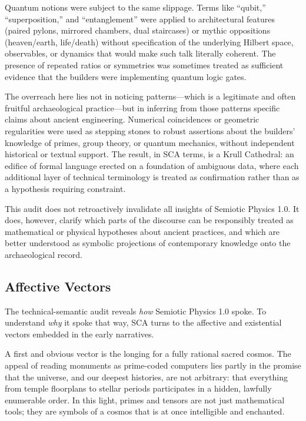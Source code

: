 \documentclass[12]{amsart}
\theoremstyle{plain}
\begin{document}
Quantum notions were subject to the same slippage. Terms like ``qubit,'' ``superposition,'' and ``entanglement'' were applied to architectural features (paired pylons, mirrored chambers, dual staircases) or mythic oppositions (heaven/earth, life/death) without specification of the underlying Hilbert space, observables, or dynamics that would make such talk literally coherent. The presence of repeated ratios or symmetries was sometimes treated as sufficient evidence that the builders were implementing quantum logic gates.

The overreach here lies not in noticing patterns---which is a legitimate and often fruitful archaeological practice---but in inferring from those patterns specific claims about ancient engineering. Numerical coincidences or geometric regularities were used as stepping stones to robust assertions about the builders' knowledge of primes, group theory, or quantum mechanics, without independent historical or textual support. The result, in SCA terms, is a Krull Cathedral: an edifice of formal language erected on a foundation of ambiguous data, where each additional layer of technical terminology is treated as confirmation rather than as a hypothesis requiring constraint.

This audit does not retroactively invalidate all insights of Semiotic Physics 1.0. It does, however, clarify which parts of the discourse can be responsibly treated as mathematical or physical hypotheses about ancient practices, and which are better understood as symbolic projections of contemporary knowledge onto the archaeological record.

\subsection{Affective Vectors}

The technical-semantic audit reveals \emph{how} Semiotic Physics 1.0 spoke. To understand \emph{why} it spoke that way, SCA turns to the affective and existential vectors embedded in the early narratives.

A first and obvious vector is the longing for a fully rational sacred cosmos. The appeal of reading monuments as prime-coded computers lies partly in the promise that the universe, and our deepest histories, are not arbitrary: that everything from temple floorplans to stellar periods participates in a hidden, lawfully enumerable order. In this light, primes and tensors are not just mathematical tools; they are symbols of a cosmos that is at once intelligible and enchanted.
\end{document}
